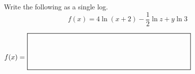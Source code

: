\documentclass[addpoints,12pt]{exam}
\newcommand*{\Scale}[2][4]{\scalebox{#1}{\ensuremath{#2}}}%
\newcommand{\chooseone}{{\Large$\Circle$\ \ }}
\begin{document}
\begin{questions}





\question[4]
Write the following as a single log.
\[
f(x)=4\ln(x+2)-\frac{1}{2}\ln z+y\ln 3
\]
\vfill
\begin{center}
            $
                \mbox{$f(x)=$ } \Scale[1.5]{\boxed{ \phantom{\dfrac{\dfrac{a}{b}}{b}} \hspace{5cm} }}
            $
            \end{center}
\newpage






\end{questions}
\end{document}
